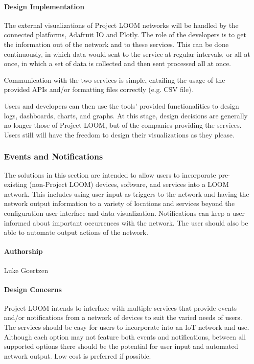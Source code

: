 \documentclass[onecolumn, draftclsnofoot,10pt, compsoc]{IEEEtran}
\begin{document}
\paragraph{Design Implementation}
    The external visualizations of Project LOOM networks will be handled by the connected platforms, Adafruit IO and Plotly. The role of the developers is to get the information out of the network and to these services. This can be done continuously, in which data would sent to the service at regular intervals, or all at once, in which a set of data is collected and then sent processed all at once. 

    Communication with the two services is simple, entailing the usage of the provided APIs and/or formatting files correctly (e.g. CSV file).

    Users and developers can then use the tools' provided functionalities to design logs, dashboards, charts, and graphs. At this stage, design decisions are generally no longer those of Project LOOM, but of the companies providing the services. Users still will have the freedom to design their visualizations as they please.


\subsubsection{Events and Notifications}
    The solutions in this section are intended to allow users to incorporate pre-existing (non-Project LOOM) devices, software, and services into a LOOM network. This includes using user input as triggers to the network and having the network output information to a variety of locations and services beyond the configuration user interface and data visualization. Notifications can keep a user informed about important occurrences with the network. The user should also be able to automate output actions of the network.

\paragraph{Authorship}
    Luke Goertzen

\paragraph{Design Concerns}
    Project LOOM intends to interface with multiple services that provide events and/or notifications from a network of devices to suit the varied needs of users. The services should be easy for users to incorporate into an IoT network and use. Although each option may not feature both events and notifications, between all supported options there should be the potential for user input and automated network output. Low cost is preferred if possible.
\end{document}
